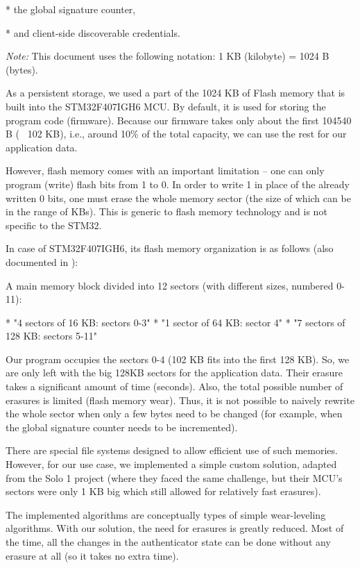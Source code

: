 * the global signature counter,

* and client-side discoverable credentials.

\enditems

{\em Note:} This document uses the following notation: 1 KB (kilobyte) = 1024 B (bytes).

As a persistent storage, we used {\sbf a part of the 1024 KB of Flash memory} that is built into the STM32F407IGH6 MCU. By default, it is used for storing the program code (firmware). Because our firmware takes only about the first 104540 B (~ 102 KB), i.e., around 10\% of the total capacity, we can use the rest for our application data.

However, flash memory comes with {\sbf an important limitation} – one can only program (write) flash bits from 1 to 0. In order to write 1 in place of the already written 0 bits, one must {\sbf erase the whole memory sector} (the size of which can be in the range of KBs). This is generic to flash memory technology and is not specific to the STM32.

In case of STM32F407IGH6, its flash memory organization is as follows (also documented in ):

A main memory block divided into 12 sectors (with different sizes, numbered 0-11):

\begitems

* "4 sectors of 16 KB: sectors 0-3"
* "1 sector of 64 KB: sector 4"
* "7 sectors of 128 KB: sectors 5-11"

\enditems

Our program occupies the sectors 0-4 (102 KB fits into the first 128 KB). So, we are only left with the big 128KB sectors for the application data. {\sbf Their erasure takes a significant amount of time} (seconds). Also, the total possible number of erasures is limited ({\sbf flash memory wear}). Thus, it is not possible to naively rewrite the whole sector when only a few bytes need to be changed (for example, when the global signature counter needs to be incremented).

There are special file systems designed to allow efficient use of such memories. However, for our use case, {\sbf we implemented a simple custom solution, adapted from the Solo 1 project} (where they faced the same challenge, but their MCU’s sectors were only 1 KB big which still allowed for relatively fast erasures).

The implemented algorithms are conceptually types of {\sbf simple wear-leveling algorithms}. With our solution, the need for erasures is greatly reduced. Most of the time, all the changes in the authenticator state can be done without any erasure at all (so it takes no extra time).

